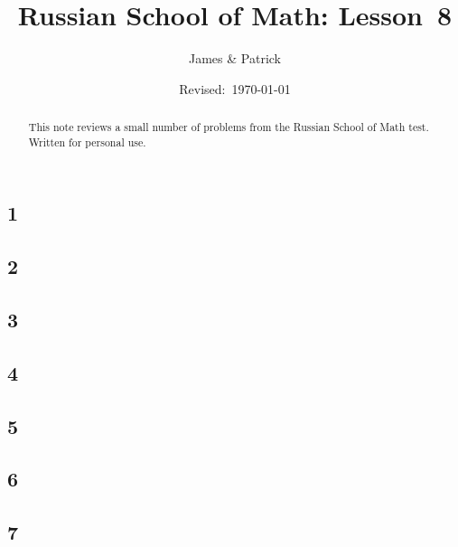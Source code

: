 \documentclass[12pt]{article}
\title{Russian School of Math: Lesson~8}
\author{James \& Patrick}
\date{Revised:~\today}
\begin{document}
\maketitle
\begin{abstract}\setlength{\parindent}{0pt}%
This note reviews a small number of problems from the Russian School of Math test. Written for personal use.
\end{abstract}

\thispagestyle{empty}
\clearpage

\subsection*{1}

\begin{solution}
  
\end{solution}

\subsection*{2}

\begin{solution}
  
\end{solution}

\subsection*{3}

\begin{solution}
  
\end{solution}

\subsection*{4}

\begin{solution}
  
\end{solution}

\subsection*{5}

\begin{solution}
  
\end{solution}

\subsection*{6}

\begin{solution}
  
\end{solution}

\subsection*{7}

\begin{solution}
  
\end{solution}
\end{document}
